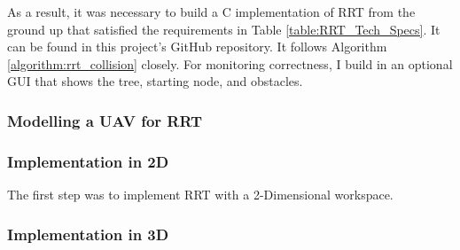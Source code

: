     As a result, it was necessary to build a C implementation of RRT from the ground up that satisfied the requirements in Table \ref{table:RRT_Tech_Specs}. It can be found in this project's GitHub repository. It follows Algorithm \ref{algorithm:rrt_collision} closely. For monitoring correctness, I build in an optional \gls{GUI} that shows the tree, starting node, and obstacles.

    \subsubsection*{Modelling a \gls{UAV} for RRT}

    \subsubsection{Implementation in 2D}
    The first step was to implement RRT with a 2-Dimensional workspace. 
    

    \subsubsection{Implementation in 3D}
    
